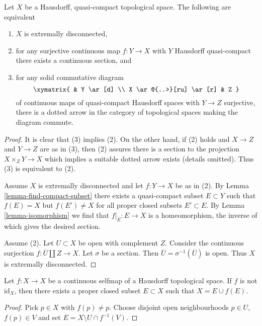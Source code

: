 \begin{proposition}
\label{proposition-projective-in-category-hausdorff-qc}
Let $X$ be a Hausdorff, quasi-compact topological space.
The following are equivalent
\begin{enumerate}
\item $X$ is extremally disconnected,
\item for any surjective continuous map $f : Y \to X$ with $Y$ Hausdorff
quasi-compact there exists a continuous section, and
\item for any solid commutative diagram
$$
\xymatrix{
& Y \ar[d] \\
X \ar@{..>}[ru] \ar[r] & Z
}
$$
of continuous maps of quasi-compact Hausdorff spaces with $Y \to Z$
surjective, there is a dotted arrow
in the category of topological spaces making the diagram commute.
\end{enumerate}
\end{proposition}

\begin{proof}
It is clear that (3) implies (2). On the other hand, if (2) holds
and $X \to Z$ and $Y \to Z$ are as in (3), then (2) assures there
is a section to the projection $X \times_Z Y \to X$ which implies
a suitable dotted arrow exists (details omitted). Thus (3)
is equivalent to (2).

\medskip\noindent
Assume $X$ is extremally disconnected and let $f : Y \to X$ be as in (2).
By Lemma \ref{lemma-find-compact-subset} there exists a quasi-compact subset
$E \subset Y$ such that $f(E) = X$ but $f(E') \not = X$ for all
proper closed subsets $E' \subset E$. By
Lemma \ref{lemma-isomorphism} we find that $f|_E : E \to X$
is a homeomorphism, the inverse of which gives the desired section.

\medskip\noindent
Assume (2). Let $U \subset X$ be open with complement $Z$.
Consider the continuous surjection $f : \overline{U} \amalg Z \to X$.
Let $\sigma$ be a section. Then $\overline{U} = \sigma^{-1}(\overline{U})$
is open. Thus $X$ is extremally disconnected.
\end{proof}

\begin{lemma}
\label{lemma-rainwater}
Let $f : X \to X$ be a continuous selfmap of a Hausdorff topological space.
If $f$ is not $\text{id}_X$, then there exists a proper closed subset
$E \subset X$ such that $X = E \cup f(E)$.
\end{lemma}

\begin{proof}
Pick $p \in X$ with $f(p) \not = p$. Choose disjoint open neighbourhoods
$p \in U$, $f(p) \in V$ and set $E = X \setminus U \cap f^{-1}(V)$.
\end{proof}


